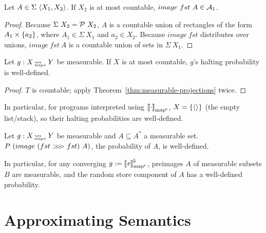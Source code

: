 \documentclass[preprint]{sigplanconf}
\newcommand{\arrow}{\rightsquigarrow}
\newcommand{\conv}{^{\mspace{-2mu}\Downarrow\mspace{-2mu}}}
\newcommand{\meaningofconv}[1]{\left\llbracket{#1}\right\rrbracket\conv}
\newcommand{\arrowcomp}{\ensuremath{{>}\mspace{-6mu}{>}\mspace{-6mu}{>}}}
\newcommand{\pmap}{_\mathrm{map^{\mspace{-2mu}*}}}
\DeclareMathOperator{\pmapto}{\arrow_{\mspace{-22mu}_{\mathrm{map*}}}}
\begin{document}
\begin{theorem}
Let $A \in \Sigma~\langle{X_1,X_2}\rangle$.
If $X_2$ is at most countable, $image~fst~A \in \mathcal{A}_1$.
\label{thm:measurable-projections}
\end{theorem}
\begin{proof}
Because $\Sigma~X_2 = \mathcal{P}~X_2$, $A$ is a countable union of rectangles of the form $A_1 \times \{{a_2}\}$, where $A_1 \in \Sigma~X_1$ and $a_2 \in X_2$.
Because $image~fst$ distributes over unions, $image~fst~A$ is a countable union of sets in $\Sigma~X_1$.
\end{proof}

\begin{theorem}
Let $g : X \pmapto Y$ be measurable.
If $X$ is at most countable, $g$'s halting probability is well-defined.
\end{theorem}
\begin{proof}
$T$ is countable; apply Theorem~\ref{thm:measurable-projections} twice.
\end{proof}

In particular, for programs interpreted using $\meaningof{\cdot}\pmap$, $X = \{{\langle{}\rangle}\}$ (the empty list/stack), so their halting probabilities are well-defined.

\begin{corollary}
Let $g : X \pmapto Y$ be measurable and $A \subseteq A^*$ a measurable set.
$P~(image~(fst~\arrowcomp~fst)~A)$, the probability of $A$, is well-defined.
\end{corollary}

In particular, for any converging $g := \meaningofconv{\mathit{e}}\pmap$, preimages $A$ of measurable subsets $B$ are measurable, and the random store component of $A$ has a well-defined probability.


\section{Approximating Semantics}
\end{document}
